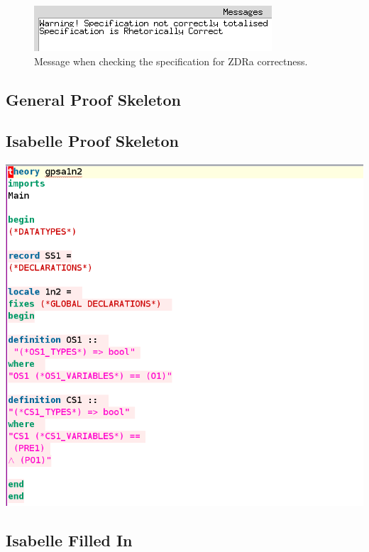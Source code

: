 \begin{figure}[H]
\includegraphics[scale=0.7]{examples/semiform/zdracorrect.png}
\caption{Message when checking the specification for ZDRa correctness.}
\end{figure}

\subsection{General Proof Skeleton}
\label{app:semiform3}


\subsection{Isabelle Proof Skeleton}
\label{app:semiform4}
\includegraphics[scale=0.4]{examples/semiform/4image.png}

\subsection{Isabelle Filled In}
\label{app:semiform5}

